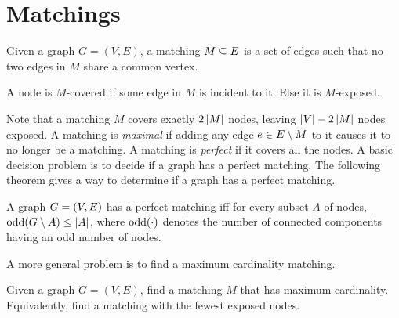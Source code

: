 \section{Matchings}
\label{sec:matchings}

\newcommand{\maxcardmatch}{\hyperref[prob:max_matching]{\textsf{Maximum Cardinality Matching}}}
\newcommand{\symdiff}{\ensuremath{\bigtriangleup}}
\newcommand{\odd}[1]{\ensuremath{\f[\mathrm{odd}]{#1}}}

\begin{definition}[Matching]
    Given a graph $G = (V, E)$, a matching $M \subseteq E$ is a set of edges such that no two edges in $M$ share 
    a common vertex. 
    \label{def:matching}
    \begin{definition}
        A node is $M$-covered if some edge in $M$ is incident to it. Else it is $M$-exposed. 
    \end{definition}
\end{definition}

Note that a matching $M$ covers exactly $2\left\lvert M \right\rvert$ nodes, leaving $\left\lvert V \right\rvert - 2\left\lvert M \right\rvert$ nodes exposed. 
A matching is \emph{maximal} if adding any edge $e \in E \setminus M$ to it causes it to no longer be a matching. 
A matching is \emph{perfect} if it covers all the nodes. A basic decision problem is to decide if a graph has a perfect matching. 
The following theorem gives a way to determine if a graph has a perfect matching. 

\begin{theorem}
    A graph $G =\left( V, E \right)$ has a perfect matching iff for every subset $A$ of nodes, $\odd{G \sm A} \leq \abs{A}$, 
    where $\odd{\cdot}$ denotes the number of connected components having an odd number of nodes.  
    \label{thm:tutte_matching}
\end{theorem}

A more general problem is to find a maximum cardinality matching. 

\begin{problem}
    Given a graph $G = (V, E)$, find a matching $M$ that has maximum cardinality. Equivalently, find a 
    matching with the fewest exposed nodes. 
    \label{prob:max_matching}
\end{problem}

